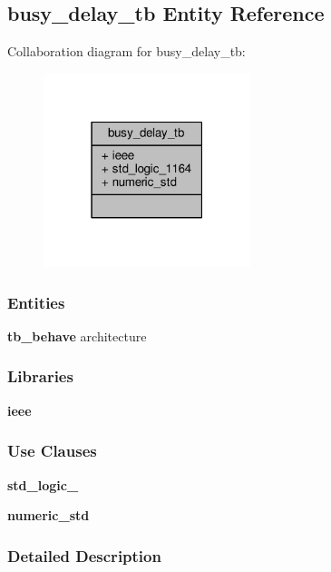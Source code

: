 \subsection{busy\+\_\+delay\+\_\+tb Entity Reference}
\label{classbusy__delay__tb}


Collaboration diagram for busy\+\_\+delay\+\_\+tb\+:\nopagebreak
\begin{figure}[H]
\begin{center}
\leavevmode
\includegraphics[width=171pt]{dc/db5/classbusy__delay__tb__coll__graph}
\end{center}
\end{figure}
\subsubsection*{Entities}
\begin{DoxyCompactItemize}
\item 
{\bf tb\+\_\+behave} architecture
\end{DoxyCompactItemize}
\subsubsection*{Libraries}
 \begin{DoxyCompactItemize}
\item 
{\bf ieee} 
\end{DoxyCompactItemize}
\subsubsection*{Use Clauses}
 \begin{DoxyCompactItemize}
\item 
{\bf std\+\_\+logic\+\_}   
\item 
{\bf numeric\+\_\+std}   
\end{DoxyCompactItemize}


\subsubsection{Detailed Description}



